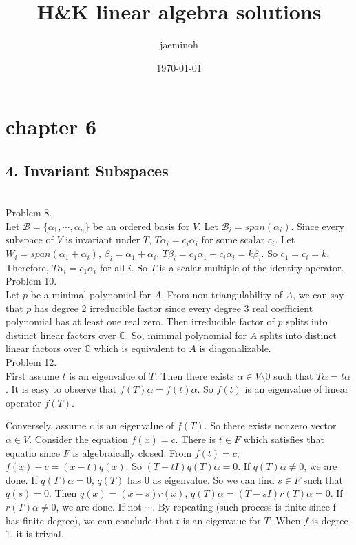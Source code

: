 \documentclass{amsart}
\author{jaeminoh}
\date{\today}
\title{H\&K linear algebra solutions}
\begin{document}
\maketitle
\section*{chapter 6}
    \subsection*{4. Invariant Subspaces}\hfill \\

    Problem 8. \\

    Let $\mathcal{B} = \{ \alpha_1, \cdots, \alpha_n \}$ be an ordered basis for $V$.
    Let $\mathcal{B}_i = span(\alpha_i)$.
    Since every subspace of $V$ is invariant under $T$, $T \alpha_i = c_i \alpha_i$ for some scalar $c_i$.
    Let $W_i = span(\alpha_1 + \alpha_i)$, $\beta_i = \alpha_1 + \alpha_i$.
    $T \beta_i = c_1 \alpha_1 + c_i \alpha_i = k\beta_i$. So $c_1 = c_i = k$.
    Therefore, $T \alpha_i = c_1 \alpha_i$ for all $i$. So $T$ is a scalar multiple of the identity operator.\\

    Problem 10. \\

    Let $p$ be a minimal polynomial for $A$.
    From non-triangulability of $A$, we can say that $p$ has degree 2 irreducible factor since every degree 3 real coefficient polynomial has at least one real zero.
    Then irreducible factor of $p$ splits into distinct linear factors over $\mathbb{C}$.
    So, minimal polynomial for $A$ splits into distinct linear factors over $\mathbb{C}$ which is equivalent to $A$ is diagonalizable.\\

    Problem 12. \\

    First assume $t$ is an eigenvalue of $T$. Then there exists $\alpha \in V \setminus 0$
    such that $T\alpha = t\alpha$. It is easy to observe that $f(T)\alpha = f(t)\alpha$.
    So $f(t)$ is an eigenvalue of linear operator $f(T)$.

    Conversely, assume $c$ is an eigenvalue of $f(T)$. So there exists nonzero vector $\alpha \in V$.
    Consider the equation $f(x) = c$. There is $t \in F$ which satisfies that equatio since $F$ is algebraically closed.
    From $f(t) = c$, $f(x) - c = (x-t)q(x)$. So $(T-tI)q(T)\alpha = 0$. If $q(T)\alpha \ne 0$, we are done.
    If $q(T)\alpha = 0$, $q(T)$ has $0$ as eigenvalue. So we can find $s \in F$ such that $q(s) = 0$.
    Then $q(x) = (x-s)r(x)$, $q(T)\alpha = (T-sI)r(T)\alpha = 0$. If $r(T)\alpha \ne 0$, we are done.
    If not $\cdots$. By repeating (such process is finite since f has finite degree), we can conclude that 
    $t$ is an eigenvaue for $T$. When $f$ is degree 1, it is trivial.
    
\end{document}
